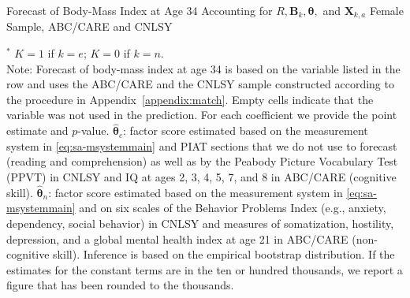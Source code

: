\begin{table}
\begin{threeparttable}
\caption{Forecast of Body-Mass Index at Age 34 Accounting for $R, \bm{B}_k, \bm{\theta},$ and $\bm{X}_{k,a}$ Female Sample, ABC/CARE and CNLSY}
\centering
\scriptsize

\begin{tablenotes}
\footnotesize
\item $^\ast$ $K=1$ if $k=e$; $K=0$ if $k=n$.\\
Note: Forecast of body-mass index at age 34 is based on the variable listed in the row and uses the ABC/CARE and the CNLSY sample constructed according to the procedure in Appendix~\ref{appendix:match}. Empty cells indicate that the variable was not used in the prediction. For each coefficient we provide the point estimate and $p$-value. $\hat{\bm{\theta}}_{c}$: factor score estimated based on the measurement system in \eqref{eq:sa-msystemmain} and PIAT sections that we do not use to forecast (reading and comprehension) as well as by the Peabody Picture Vocabulary Test (PPVT) in CNLSY and IQ at ages 2, 3, 4, 5, 7, and 8 in ABC/CARE (cognitive skill). $\hat{\bm{\theta}}_{n}$: factor score estimated based on the measurement system in \eqref{eq:sa-msystemmain} and on six scales of the Behavior Problems Index (e.g., anxiety, dependency, social behavior) in CNLSY and measures of somatization, hostility, depression, and a global mental health index at age 21 in ABC/CARE (non-cognitive skill). Inference is based on the empirical bootstrap distribution. If the estimates for the constant terms are in the ten or hundred thousands, we report a figure that has been rounded to the thousands.
\end{tablenotes}
\end{threeparttable}
\end{table}


